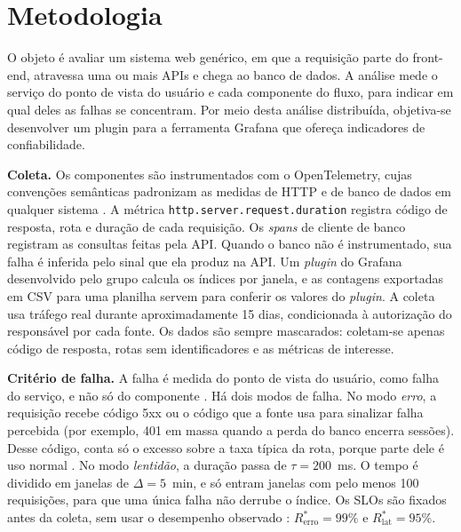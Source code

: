 
\section{Metodologia}

O objeto é avaliar um sistema web genérico, em que a requisição parte do
front-end, atravessa uma ou mais APIs e chega ao banco de dados. A análise
mede o serviço do ponto de vista do usuário e cada componente do fluxo,
para indicar em qual deles as falhas se concentram. Por meio desta análise
distribuída, objetiva-se desenvolver um plugin para a ferramenta Grafana que
ofereça indicadores de confiabilidade.

\textbf{Coleta.} Os componentes são instrumentados com o OpenTelemetry,
cujas convenções semânticas padronizam as medidas de HTTP e de banco de
dados em qualquer sistema \cite{otel_site}. A métrica
\texttt{http.server.request.duration} registra código de resposta, rota e
duração de cada requisição. Os \textit{spans} de cliente de banco registram
as consultas feitas pela API. Quando o banco não é instrumentado, sua falha
é inferida pelo sinal que ela produz na API. Um \textit{plugin} do
Grafana desenvolvido pelo grupo calcula os índices por janela, e as
contagens exportadas em CSV para uma planilha servem para conferir os
valores do \textit{plugin}. A coleta usa tráfego real durante
aproximadamente 15 dias, condicionada à autorização do responsável por
cada fonte. Os dados são sempre mascarados: coletam-se apenas código de
resposta, rotas sem identificadores e as métricas de interesse.

\textbf{Critério de falha.} A falha é medida do ponto de vista do usuário,
como falha do serviço, e não só do componente \cite{oppenheimer2003}. Há
dois modos de falha. No modo \textit{erro}, a requisição recebe código 5xx
ou o código que a fonte usa para sinalizar falha percebida (por exemplo,
401 em massa quando a perda do banco encerra sessões). Desse código, conta
só o excesso sobre a taxa típica da rota, porque parte dele é uso normal
\cite{goseva2004}. No modo \textit{lentidão}, a duração passa de
$\tau = 200$~ms. O tempo é dividido em janelas de $\Delta = 5$~min, e só
entram janelas com pelo menos 100 requisições, para que uma única falha
não derrube o índice. Os SLOs são fixados antes da coleta, sem usar o
desempenho observado \cite{jones2016slo}: $R^{*}_{\mathrm{erro}} = 99\%$ e
$R^{*}_{\mathrm{lat}} = 95\%$.

